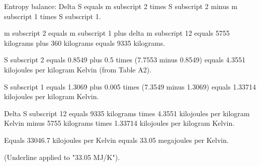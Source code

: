 Entropy balance:  
Delta S equals m subscript 2 times S subscript 2 minus m subscript 1 times S subscript 1.  

m subscript 2 equals m subscript 1 plus delta m subscript 12 equals 5755 kilograms plus 360 kilograms equals 9335 kilograms.  

S subscript 2 equals 0.8549 plus 0.5 times (7.7553 minus 0.8549) equals 4.3551 kilojoules per kilogram Kelvin (from Table A2).  

S subscript 1 equals 1.3069 plus 0.005 times (7.3549 minus 1.3069) equals 1.33714 kilojoules per kilogram Kelvin.  

Delta S subscript 12 equals 9335 kilograms times 4.3551 kilojoules per kilogram Kelvin minus 5755 kilograms times 1.33714 kilojoules per kilogram Kelvin.  

Equals 33046.7 kilojoules per Kelvin equals 33.05 megajoules per Kelvin.  

(Underline applied to "33.05 MJ/K").